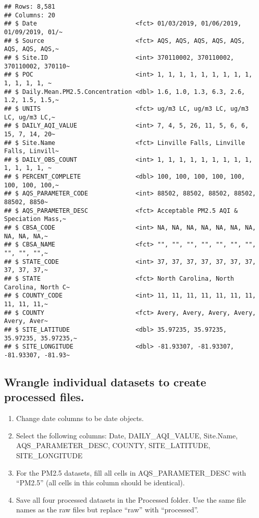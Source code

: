 \documentclass[
]{article}
\begin{document}
\begin{verbatim}
## Rows: 8,581
## Columns: 20
## $ Date                           <fct> 01/03/2019, 01/06/2019, 01/09/2019, 01/~
## $ Source                         <fct> AQS, AQS, AQS, AQS, AQS, AQS, AQS, AQS,~
## $ Site.ID                        <int> 370110002, 370110002, 370110002, 370110~
## $ POC                            <int> 1, 1, 1, 1, 1, 1, 1, 1, 1, 1, 1, 1, 1, ~
## $ Daily.Mean.PM2.5.Concentration <dbl> 1.6, 1.0, 1.3, 6.3, 2.6, 1.2, 1.5, 1.5,~
## $ UNITS                          <fct> ug/m3 LC, ug/m3 LC, ug/m3 LC, ug/m3 LC,~
## $ DAILY_AQI_VALUE                <int> 7, 4, 5, 26, 11, 5, 6, 6, 15, 7, 14, 20~
## $ Site.Name                      <fct> Linville Falls, Linville Falls, Linvill~
## $ DAILY_OBS_COUNT                <int> 1, 1, 1, 1, 1, 1, 1, 1, 1, 1, 1, 1, 1, ~
## $ PERCENT_COMPLETE               <dbl> 100, 100, 100, 100, 100, 100, 100, 100,~
## $ AQS_PARAMETER_CODE             <int> 88502, 88502, 88502, 88502, 88502, 8850~
## $ AQS_PARAMETER_DESC             <fct> Acceptable PM2.5 AQI & Speciation Mass,~
## $ CBSA_CODE                      <int> NA, NA, NA, NA, NA, NA, NA, NA, NA, NA,~
## $ CBSA_NAME                      <fct> "", "", "", "", "", "", "", "", "", "",~
## $ STATE_CODE                     <int> 37, 37, 37, 37, 37, 37, 37, 37, 37, 37,~
## $ STATE                          <fct> North Carolina, North Carolina, North C~
## $ COUNTY_CODE                    <int> 11, 11, 11, 11, 11, 11, 11, 11, 11, 11,~
## $ COUNTY                         <fct> Avery, Avery, Avery, Avery, Avery, Aver~
## $ SITE_LATITUDE                  <dbl> 35.97235, 35.97235, 35.97235, 35.97235,~
## $ SITE_LONGITUDE                 <dbl> -81.93307, -81.93307, -81.93307, -81.93~
\end{verbatim}

\hypertarget{wrangle-individual-datasets-to-create-processed-files.}{%
\subsection{Wrangle individual datasets to create processed
files.}\label{wrangle-individual-datasets-to-create-processed-files.}}

\begin{enumerate}
\def\labelenumi{\arabic{enumi}.}
\setcounter{enumi}{2}
\item
  Change date columns to be date objects.
\item
  Select the following columns: Date, DAILY\_AQI\_VALUE, Site.Name,
  AQS\_PARAMETER\_DESC, COUNTY, SITE\_LATITUDE, SITE\_LONGITUDE
\item
  For the PM2.5 datasets, fill all cells in AQS\_PARAMETER\_DESC with
  ``PM2.5'' (all cells in this column should be identical).
\item
  Save all four processed datasets in the Processed folder. Use the same
  file names as the raw files but replace ``raw'' with ``processed''.
\end{enumerate}
\end{document}
